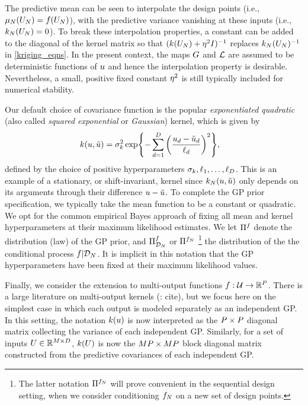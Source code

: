 \documentclass[12pt]{article}
\begin{document}
The predictive mean can be seen to interpolate the design points (i.e., $\gpMean[\Ndesign](\designIn) = \func(\designIn)$), with 
the predictive variance vanishing at these inputs (i.e., $\gpKer[\Ndesign](\designIn) = 0$). To break these interpolation properties,
a constant can be added to the diagonal of the kernel matrix so that $(\gpKerPrior(\designIn) + \nuggetSD^2 I)^{-1}$ replaces 
$\gpKer(\designIn)^{-1}$ in \ref{kriging_eqns}. In the present context, the maps $\fwd$ and $\llik$ are assumed to be deterministic functions 
of $\Par$ and hence the interpolation property is desirable. Nevertheless, a small, positive fixed constant $\nuggetSD^2$ is still 
typically included for numerical stability. 

Our default choice of covariance function is the popular \textit{exponentiated quadratic} 
(also called \textit{squared exponential} or \textit{Gaussian}) kernel, which is given by 
\begin{align}
\gpKerPrior(\Par, \tilde{\Par}) &= 
\margSD^2 \Exp{- \sum_{\idxParDim=1}^{\dimPar} \left(\frac{\Par_{\idxParDim} - \tilde{\Par}_{\idxParDim}}{\lengthscale_{\idxParDim}} \right)^2}, 
\end{align}
defined by the choice of positive hyperparameters $\margSD, \lengthscale_{1}, \dots, \lengthscale_{\dimPar}$. This is an example
of a stationary, or shift-invariant, kernel since $\gpKer(\Par, \tilde{\Par})$ only depends on its arguments through their difference 
$\Par - \tilde{\Par}$. To complete the GP prior specification, we typically take the mean 
function to be a constant or quadratic. We opt for the common empirical Bayes approach of fixing all mean and kernel hyperparameters 
at their maximum likelihood estimates. We let $\emLawPrior{\func}$ denote the distribution (law) of the GP prior, and 
$\emLaw{\func}$ or $\emLaw[]{\funcEm}$
\footnote{The latter notation $\emLaw[]{\funcEm}$ will prove convenient in the sequential design setting, when we consider 
conditioning $\funcEm$ on a new set of design points.} 
the distribution of the the conditional process $\func | \design[\Ndesign]$. It is implicit in this notation 
that the GP hyperparameters have been fixed at their maximum likelihood values. 

Finally, we consider the extension to multi-output functions $\func: \parSpace \to \R^{\dimObs}$. There is a large literature on multi-output 
kernels (\todo: cite), but we focus here on the simplest case in which each output is modeled separately as an independent GP. 
In this setting, the notation $\gpKerPrior(\Par)$ is now interpreted as the $\dimObs \times \dimObs$ diagonal matrix collecting the variance of each 
independent GP. Similarly, for a set of inputs $\parMat \in \R^{M \times \dimPar}$, $\gpKerPrior(\parMat)$ is now the 
$M\dimObs \times M\dimObs$ block diagonal matrix constructed from the predictive covariances of each independent GP. 
\end{document}
